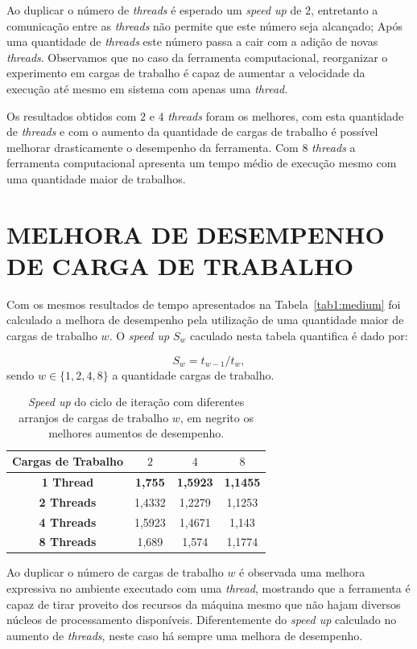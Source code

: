 Ao duplicar o número de \textit{threads} é esperado um \textit{speed up} de $2$, entretanto a comunicação entre as \textit{threads} não permite que este número seja alcançado; Após uma quantidade de \textit{threads} este número passa a cair com a adição de novas \textit{threads}. Observamos que no caso da ferramenta computacional, reorganizar o experimento em cargas de trabalho é capaz de aumentar a velocidade da execução até mesmo em sistema com apenas uma \textit{thread}.

Os resultados obtidos com $2$ e $4$ \textit{threads} foram os melhores, com esta quantidade de \textit{threads} e com o aumento da quantidade de cargas de trabalho é possível melhorar drasticamente o desempenho da ferramenta. Com $8$ \textit{threads} a ferramenta computacional apresenta um tempo médio de execução mesmo com uma quantidade maior de trabalhos.

\section{MELHORA DE DESEMPENHO DE CARGA DE TRABALHO}\label{sec:cenario5}

Com os mesmos resultados de tempo apresentados na Tabela~\ref{tab1:medium} foi calculado a melhora de desempenho pela utilização de uma quantidade maior de cargas de trabalho $w$. O \textit{speed up} $S_w$ caculado nesta tabela quantifica é dado por:

\begin{equation}
	S_w = t_{w-1}/t_{w},
	\label{eq:speedup2}
\end{equation}
sendo $w \in \{1,2,4,8\}$ a quantidade cargas de trabalho.

\begin{table}[!htbp]
\caption{\textit{Speed up} do ciclo de iteração com diferentes arranjos de cargas de trabalho $w$, em negrito os melhores aumentos de desempenho.}
\centering{}
\begin{tabular}{c|c|c|c}
	\toprule 
	\textbf{Cargas de Trabalho} & $2$ & $4$  & $8$\\ 
	\midrule 
	\textbf{1 Thread} & \textbf{1,755} &	\textbf{1,5923} &	\textbf{1,1455} \\ 
	\midrule 
	\textbf{2 Threads} & 1,4332 &	1,2279 & 1,1253\\ 
	\midrule 
	\textbf{4 Threads} & 1,5923 &	1,4671 &	1,143\\ 
	\midrule 
	\textbf{8 Threads} & 1,689 &	1,574 & 1,1774	\\ 
	\bottomrule 
\end{tabular} 
\label{tab1:speedup2}
\end{table}

Ao duplicar o número de cargas de trabalho $w$ é observada uma melhora expressiva no ambiente executado com uma \textit{thread}, mostrando que a ferramenta é capaz de tirar proveito dos recursos da máquina mesmo que não hajam diversos núcleos de processamento disponíveis. Diferentemente do \textit{speed up} calculado no aumento de \textit{threads}, neste caso há sempre uma melhora de desempenho.